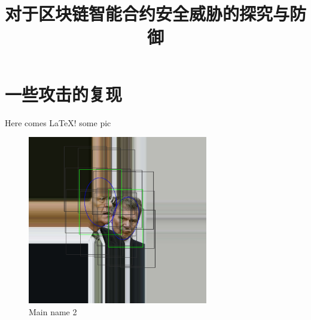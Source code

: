 \documentclass[]{ctexart}
\begin{document}
\title{对于区块链智能合约安全威胁的探究与防御}

\section{一些攻击的复现}

Here comes \LaTeX!
some pic
\begin{figure}[H] %
    \centering %
    \includegraphics[width=0.7\textwidth]{report/2002-07-25-big-img_1047-expand.jpg} %
    \caption{Main name 2} %
    \label{Fig.main2} %
\end{figure}
\end{document}
